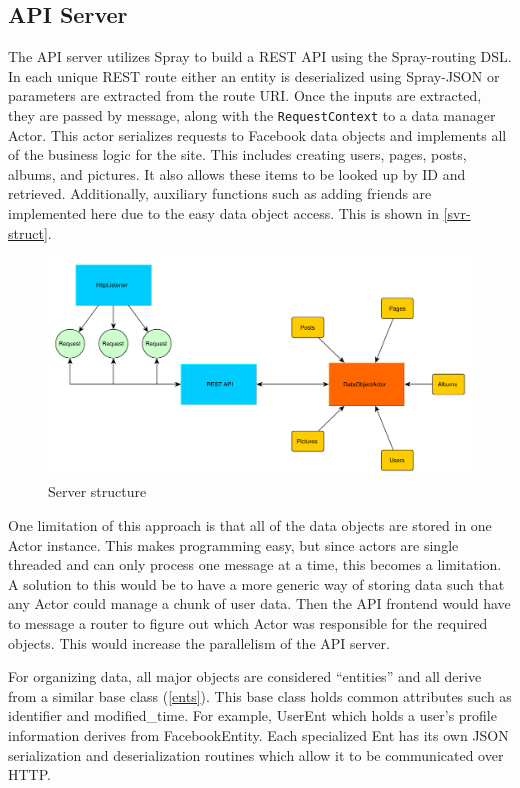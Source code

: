 \documentclass{article}
\begin{document}
\subsection*{API Server}
The API server utilizes Spray to build a REST API using the Spray-routing DSL. In each unique REST route either an entity is deserialized using Spray-JSON or parameters are extracted from the route URI. Once the inputs are extracted, they are passed by message, along with the \texttt{RequestContext} to a data manager Actor. This actor serializes requests to Facebook data objects and implements all of the business logic for the site. This includes creating users, pages, posts, albums, and pictures. It also allows these items to be looked up by ID and retrieved. Additionally, auxiliary functions such as adding friends are implemented here due to the easy data object access. This is shown in \autoref{svr-struct}.

\begin{figure}[H]
  \centering
  \includegraphics[scale=0.5]{diagrams/server-structure.pdf}
  \caption{Server structure}
  \label{svr-struct}
\end{figure}

One limitation of this approach is that all of the data objects are stored in one Actor instance. This makes programming easy, but since actors are single threaded and can only process one message at a time, this becomes a limitation. A solution to this would be to have a more generic way of storing data such that any Actor could manage a chunk of user data. Then the API frontend would have to message a router to figure out which Actor was responsible for the required objects. This would increase the parallelism of the API server.

For organizing data, all major objects are considered ``entities'' and all derive from a similar base class (\autoref{ents}). This base class holds common attributes such as identifier and modified\_time. For example, UserEnt which holds a user's profile information derives from FacebookEntity. Each specialized Ent has its own JSON serialization and deserialization routines which allow it to be communicated over HTTP.
\end{document}
